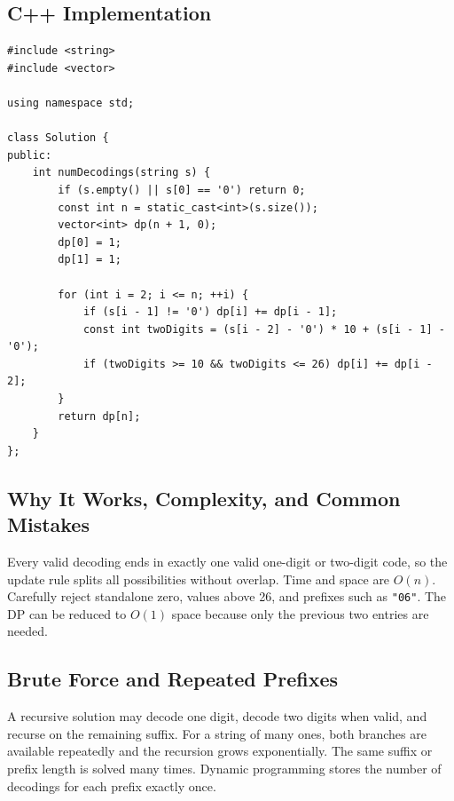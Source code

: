 \subsection{C++ Implementation}
\begin{lstlisting}[style=compactcode,caption={Complete C++ solution: Decode Ways}]
#include <string>
#include <vector>

using namespace std;

class Solution {
public:
    int numDecodings(string s) {
        if (s.empty() || s[0] == '0') return 0;
        const int n = static_cast<int>(s.size());
        vector<int> dp(n + 1, 0);
        dp[0] = 1;
        dp[1] = 1;

        for (int i = 2; i <= n; ++i) {
            if (s[i - 1] != '0') dp[i] += dp[i - 1];
            const int twoDigits = (s[i - 2] - '0') * 10 + (s[i - 1] - '0');
            if (twoDigits >= 10 && twoDigits <= 26) dp[i] += dp[i - 2];
        }
        return dp[n];
    }
};
\end{lstlisting}

\subsection{Why It Works, Complexity, and Common Mistakes}
Every valid decoding ends in exactly one valid one-digit or two-digit code, so
the update rule splits all possibilities without overlap. Time and space
are \(O(n)\). Carefully reject standalone zero, values above 26, and prefixes
such as \texttt{"06"}. The DP can be reduced to \(O(1)\) space because only
the previous two entries are needed.

\subsection{Brute Force and Repeated Prefixes}
A recursive solution may decode one digit, decode two digits when valid, and
recurse on the remaining suffix. For a string of many ones, both branches are
available repeatedly and the recursion grows exponentially. The same suffix
or prefix length is solved many times. Dynamic programming stores the number
of decodings for each prefix exactly once.

